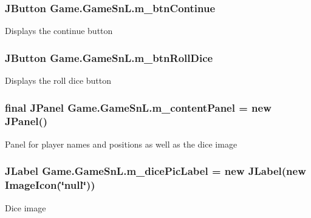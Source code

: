 \subsubsection[{m\+\_\+btn\+Continue}]{\setlength{\rightskip}{0pt plus 5cm}J\+Button Game.\+Game\+Sn\+L.\+m\+\_\+btn\+Continue\hspace{0.3cm}{\ttfamily [private]}}\label{class_game_1_1_game_sn_l_a6e2e15971627fbc196ed207742a79e44}
Displays the continue button \hypertarget{class_game_1_1_game_sn_l_acc91a4663c2f1c4ee9381a070332d7a2}{}
\subsubsection[{m\+\_\+btn\+Roll\+Dice}]{\setlength{\rightskip}{0pt plus 5cm}J\+Button Game.\+Game\+Sn\+L.\+m\+\_\+btn\+Roll\+Dice\hspace{0.3cm}{\ttfamily [private]}}\label{class_game_1_1_game_sn_l_acc91a4663c2f1c4ee9381a070332d7a2}
Displays the roll dice button \hypertarget{class_game_1_1_game_sn_l_a073ab891cd1c2854f4dd4081cfc1319c}{}
\subsubsection[{m\+\_\+content\+Panel}]{\setlength{\rightskip}{0pt plus 5cm}final J\+Panel Game.\+Game\+Sn\+L.\+m\+\_\+content\+Panel = new J\+Panel()\hspace{0.3cm}{\ttfamily [private]}}\label{class_game_1_1_game_sn_l_a073ab891cd1c2854f4dd4081cfc1319c}
Panel for player names and positions as well as the dice image \hypertarget{class_game_1_1_game_sn_l_a59399bbb046839055516f0ce733b9ba7}{}
\subsubsection[{m\+\_\+dice\+Pic\+Label}]{\setlength{\rightskip}{0pt plus 5cm}J\+Label Game.\+Game\+Sn\+L.\+m\+\_\+dice\+Pic\+Label = new J\+Label(new Image\+Icon(\char`\"{}null\char`\"{}))\hspace{0.3cm}{\ttfamily [private]}}\label{class_game_1_1_game_sn_l_a59399bbb046839055516f0ce733b9ba7}
Dice image \hypertarget{class_game_1_1_game_sn_l_a694cff89aec27b85a6b970b2304c6968}{}
